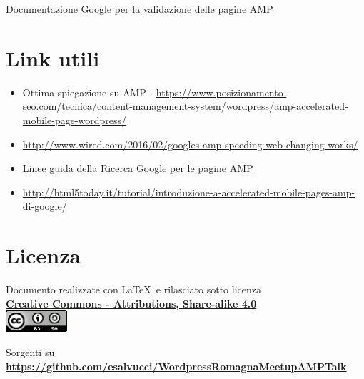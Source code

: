 \documentclass{article}
\begin{document}
\href{https://www.ampproject.org/docs/guides/validate.html}{Documentazione Google per la validazione delle pagine AMP}

\section{Link utili}
\begin{itemize}
    \item Ottima spiegazione su AMP - \href{https://www.posizionamento-seo.com/tecnica/content-management-system/wordpress/amp-accelerated-mobile-page-wordpress/}{https://www.posizionamento-seo.com/tecnica/content-management-system/wordpress/amp-accelerated-mobile-page-wordpress/}
    \item \href{http://www.wired.com/2016/02/googles-amp-speeding-web-changing-works/}{http://www.wired.com/2016/02/googles-amp-speeding-web-changing-works/}
    \item \href{https://support.google.com/webmasters/answer/6340290?hl=it}{Linee guida della Ricerca Google per le pagine AMP}
    \item \href{http://html5today.it/tutorial/introduzione-a-accelerated-mobile-pages-amp-di-google/}{http://html5today.it/tutorial/introduzione-a-accelerated-mobile-pages-amp-di-google/}
\end{itemize}

\section{Licenza}

Documento realizzate con \LaTeX\ e rilasciato sotto licenza\\
\textbf{\href{http://creativecommons.org/licenses/by-sa/4.0/}{Creative Commons - Attributions, Share-alike 4.0}}\\

\includegraphics[height=0.8cm]{images/cc.png}

Sorgenti su \textbf{\url{https://github.com/esalvucci/WordpressRomagnaMeetupAMPTalk}}
\end{document}
